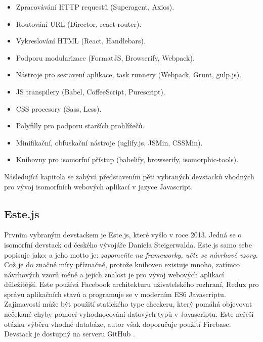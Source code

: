 \begin{itemize}
\item Zpracovávání HTTP requestů (Superagent, Axios).
\item Routování URL (Director, react-router).
\item Vykreslování HTML (React, Handlebars).
\item Podporu modularizace (FormatJS, Browserify, Webpack).
\item Nástroje pro sestavení aplikace, task runnery (Webpack, Grunt, gulp.js).
\item JS transpilery (Babel, CoffeeScript, Purescript).
\item CSS procesory (Sass, Less).
\item Polyfilly pro podporu starších prohlížečů.
\item Minifikační, obfuskační nástroje (uglify.js, JSMin, CSSMin).
\item Knihovny pro isomorfní přístup (babelify, browserify, isomorphic-tools).
\end{itemize}

Následující kapitola se zabývá představením pěti vybraných devstacků vhodných pro vývoj isomorfních webových aplikací v jazyce Javascript.

\subsection{Este.js}
Prvním vybraným devstackem je Este.js, které vyšlo v roce 2013. Jedná se o isomorfní devstack od českého vývojáře Daniela Steigerwalda. Este.js samo sebe popisuje jako:  a jeho motto je: \textit{zapomeňte na frameworky, učte se návrhové vzory}. Což je do značné míry příznačné, protože knihoven existuje mnoho, zatímco návrhových vzorů méně a jejich znalost je pro vývoj webových aplikací důležitější. Este používá Facebook architekturu uživatelského rozhraní, Redux pro správu aplikačních stavů a programuje se v moderním ES6 Javascriptu. Zajímavostí může být použití statického type checkeru, který pomáhá objevovat nečekané chyby pomocí vyhodnocování datových typů v Javascriptu. Este neřeší otázku výběru vhodné databáze, autor však doporučuje použití Firebase. Devstack je dostupný na serveru GitHub \cite{este} \cite{isomorphic_pimentel}.

